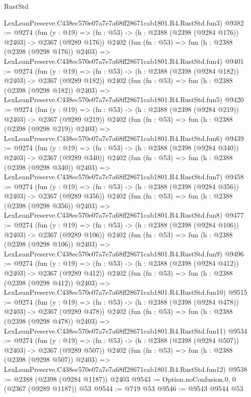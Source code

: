 \begin{lexlean}{RustStd}
\begin{coremodule}
    LexLeanPreserve.C438ec570e07a7e7a68ff28671cab1801.R4.RustStd.fun3)
@9382 := @9274
    (fun (y : @19) => (fn : @53) -> (h : @2388 (@2398 (@9284 @176)) @2403) -> @2367 (@9289 @176))
    @2402
    (fun (fn : @53) =>
    fun (h : @2388 (@2398 (@9298 @176)) @2403) =>
    LexLeanPreserve.C438ec570e07a7e7a68ff28671cab1801.R4.RustStd.fun4)
@9401 := @9274
    (fun (y : @19) => (fn : @53) -> (h : @2388 (@2398 (@9284 @182)) @2403) -> @2367 (@9289 @182))
    @2402
    (fun (fn : @53) =>
    fun (h : @2388 (@2398 (@9298 @182)) @2403) =>
    LexLeanPreserve.C438ec570e07a7e7a68ff28671cab1801.R4.RustStd.fun5)
@9420 := @9274
    (fun (y : @19) => (fn : @53) -> (h : @2388 (@2398 (@9284 @219)) @2403) -> @2367 (@9289 @219))
    @2402
    (fun (fn : @53) =>
    fun (h : @2388 (@2398 (@9298 @219)) @2403) =>
    LexLeanPreserve.C438ec570e07a7e7a68ff28671cab1801.R4.RustStd.fun6)
@9439 := @9274
    (fun (y : @19) => (fn : @53) -> (h : @2388 (@2398 (@9284 @340)) @2403) -> @2367 (@9289 @340))
    @2402
    (fun (fn : @53) =>
    fun (h : @2388 (@2398 (@9298 @340)) @2403) =>
    LexLeanPreserve.C438ec570e07a7e7a68ff28671cab1801.R4.RustStd.fun7)
@9458 := @9274
    (fun (y : @19) => (fn : @53) -> (h : @2388 (@2398 (@9284 @356)) @2403) -> @2367 (@9289 @356))
    @2402
    (fun (fn : @53) =>
    fun (h : @2388 (@2398 (@9298 @356)) @2403) =>
    LexLeanPreserve.C438ec570e07a7e7a68ff28671cab1801.R4.RustStd.fun8)
@9477 := @9274
    (fun (y : @19) => (fn : @53) -> (h : @2388 (@2398 (@9284 @106)) @2403) -> @2367 (@9289 @106))
    @2402
    (fun (fn : @53) =>
    fun (h : @2388 (@2398 (@9298 @106)) @2403) =>
    LexLeanPreserve.C438ec570e07a7e7a68ff28671cab1801.R4.RustStd.fun9)
@9496 := @9274
    (fun (y : @19) => (fn : @53) -> (h : @2388 (@2398 (@9284 @412)) @2403) -> @2367 (@9289 @412))
    @2402
    (fun (fn : @53) =>
    fun (h : @2388 (@2398 (@9298 @412)) @2403) =>
    LexLeanPreserve.C438ec570e07a7e7a68ff28671cab1801.R4.RustStd.fun10)
@9515 := @9274
    (fun (y : @19) => (fn : @53) -> (h : @2388 (@2398 (@9284 @478)) @2403) -> @2367 (@9289 @478))
    @2402
    (fun (fn : @53) =>
    fun (h : @2388 (@2398 (@9298 @478)) @2403) =>
    LexLeanPreserve.C438ec570e07a7e7a68ff28671cab1801.R4.RustStd.fun11)
@9534 := @9274
    (fun (y : @19) => (fn : @53) -> (h : @2388 (@2398 (@9284 @507)) @2403) -> @2367 (@9289 @507))
    @2402
    (fun (fn : @53) =>
    fun (h : @2388 (@2398 (@9298 @507)) @2403) =>
    LexLeanPreserve.C438ec570e07a7e7a68ff28671cab1801.R4.RustStd.fun12)
@9538 := @2388 (@2398 (@9284 @1187)) @2403
@9543 := Option.noConfusion.{0, 0} (@2367 (@9289 @1187)) @53
@9544 := @719 @53
@9546 := @9543 @9544 @53

\end{coremodule}
\end{lexlean}
